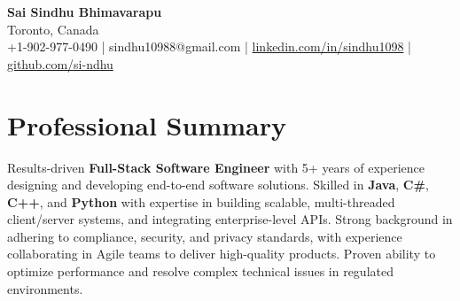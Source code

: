 \documentclass[letterpaper,11pt]{article}
\begin{document}
\begin{center}
  {\Large \textbf{Sai Sindhu Bhimavarapu}} \\
  Toronto, Canada \\
  +1-902-977-0490 \enspace | \enspace sindhu10988@gmail.com \enspace | \enspace \href{https://www.linkedin.com/in/sindhu1098/}{linkedin.com/in/sindhu1098} \enspace | \enspace \href{https://github.com/si-ndhu}{github.com/si-ndhu}
\end{center}

\section{Professional Summary}
  \begin{itemize}[leftmargin=0.15in, label={}]
    \small{\item{
     Results-driven \textbf{Full-Stack Software Engineer} with 5+ years of experience designing and developing end-to-end software solutions. Skilled in \textbf{Java}, \textbf{C\#}, \textbf{C++}, and \textbf{Python} with expertise in building scalable, multi-threaded client/server systems, and integrating enterprise-level APIs. Strong background in adhering to compliance, security, and privacy standards, with experience collaborating in Agile teams to deliver high-quality products. Proven ability to optimize performance and resolve complex technical issues in regulated environments.
    }}
  \end{itemize}
\vspace{-16pt}

\end{document}
